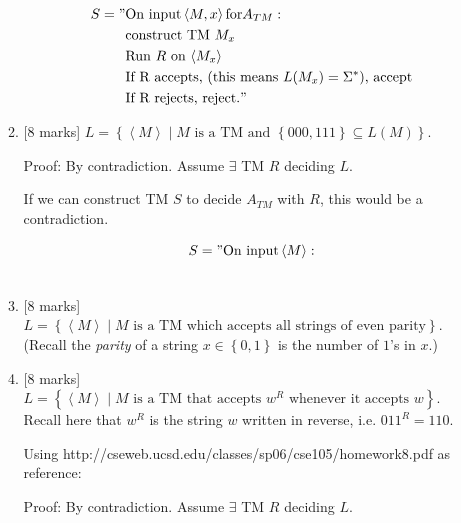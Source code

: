 \documentclass{article}
\newcommand{\set}[1]{{\left\{#1\right\}}}    %
\newcommand{\enc}[1]{\left<#1\right>}
\begin{document}
\begin{enumerate}
\begin{enumerate}
                    \begin{equation}
                        \begin{split}
                           S = "& \text{On input} \enc{M,x} \text{for} A_{TM}: \\
                                & \text{construct TM } M_x \\
                                & \text{Run $R$ on $\enc{M_x}$} \\
                                & \text{If R accepts, (this means $L(M_x) = \Sigma^*$), accept} \\
                                & \text{If R rejects, reject.}"
                        \end{split}
                    \end{equation}

            \item {[8 marks]} $L=\set{\enc{M}\mid M\text{ is a TM and }\set{000,111}\subseteq L(M)}$.


            		Proof: By contradiction. Assume $\exists$ TM $R$ deciding $L$.

                    If we can construct TM $S$ to decide $A_{TM}$ with $R$, this would be a contradiction.

                    \begin{equation}
                        \begin{split}
                           S = "& \text{On input} \enc{M}: \\
                                &  \\
                        \end{split}
                    \end{equation}


            \item {[8 marks]} $L=\set{\enc{M}\mid M\text{ is a TM which accepts all strings of even parity}}$. (Recall the \emph{parity} of a string $x\in\set{0,1}$ is the number of $1$'s in $x$.)



        	\item {[8 marks]} $L=\set{\enc{M}\mid M\text{ is a TM that accepts }w^R\text{ whenever it accepts }w}$. Recall here that $w^R$ is the string $w$ written in reverse, i.e. $011^R=110$.

            Using http://cseweb.ucsd.edu/classes/sp06/cse105/homework8.pdf as reference:

            Proof: By contradiction. Assume $\exists$ TM $R$ deciding $L$.


\end{enumerate}
\end{enumerate}
\end{document}

